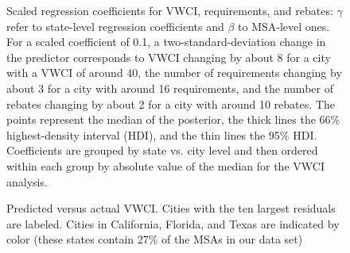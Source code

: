 \documentclass[draft,linenumbers]{agujournal}\usepackage{knitr}
\begin{document}
\begin{figure}[h]
\caption{Scaled regression coefficients for VWCI, requirements, and rebates: $\gamma$ refer to state-level regression coefficients and $\beta$ to MSA-level ones.
For a scaled coefficient of 0.1, a two-standard-deviation change in the predictor corresponds to VWCI changing by about 8 for a city with a VWCI of around 40, the number of requirements changing by about 3 for a city with around 16 requirements, and the number of rebates changing by about 2 for a city with around 10 rebates. The points represent the median of the posterior, the thick lines the 66\% highest-density interval (HDI), and the thin lines the 95\% HDI. Coefficients are grouped by state vs. city level and then ordered within each group by absolute value of the median for the VWCI analysis.}\label{fig:vwci_cat_plot}
\end{figure}


\begin{figure}[h]
\caption{Predicted versus actual VWCI. Cities with the ten largest residuals are labeled. Cities in California, Florida, and Texas are indicated by color (these states contain 27\% of the MSAs in our data set)}\label{fig:vwci_residuals}
\end{figure}


\listofchanges
\end{document}
